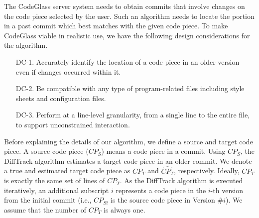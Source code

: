 \label{section:Piece_level_Diff_Backtrack_Algorithm}

The CodeGlass server system needs to obtain commits that involve changes on the code piece selected by the user.
Such an algorithm needs to locate the portion in a past commit which best matches with the given code piece.
To make CodeGlass viable in realistic use, we have the following design considerations for the algorithm.


      
\begin{itemize}
\setlength{\parskip}{1mm}
\setlength{\leftskip}{7mm}
\setlength{\itemsep}{0cm}
\item[DC-1.] Accurately identify the location of a code piece in an older version even if changes occurred within it.
\item[DC-2.] Be compatible with any type of program-related files including style sheets and configuration files.
\item[DC-3.] Perform at a line-level granularity, from a single line to the entire file, to support unconstrained interaction.
\end{itemize}



      

Before explaining the details of our algorithm, we define a source and target code piece.
A source code piece ($CP_{S}$) means a code piece in a commit.
Using $CP_{S}$, the DiffTrack algorithm estimates a target code piece in an older commit.
We denote a true and estimated target code piece as $CP_{T}$ and $\widehat{CP_{T}}$, respectively.
Ideally, $\widehat{CP_{T}}$ is exactly the same set of lines of $CP_{T}$.
As the DiffTrack algorithm is executed iteratively, an additional subscript $i$ represents a code piece in the $i$-th version from the initial commit (i.e., $CP_{Si}$ is the source code piece in Version \#$i$).
We assume that the number of $CP_T$ is always one.

